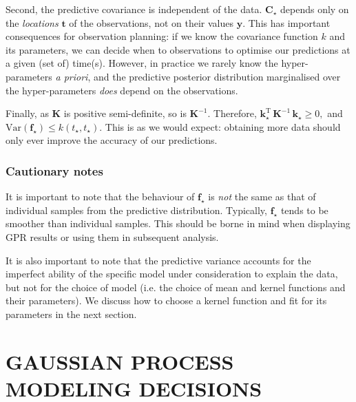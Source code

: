 \documentclass[letterpaper]{ar-1col}
\begin{document}
Second, the predictive covariance is independent of the data. $\mathbf{C}_\star$ depends only on the \emph{locations} $\mathbf{t}$ of the observations, not on their values $\mathbf{y}$. This has important consequences for observation planning: if we know the covariance function $k$ and its parameters, we can decide when to observations to optimise our predictions at a given (set of) time(s). However, in practice we rarely know the hyper-parameters \textit{a priori}, and the predictive posterior distribution marginalised over the hyper-parameters \textit{does} depend on the observations.

Finally, as $\mathbf{K}$ is positive semi-definite, so is $\mathbf{K}^{-1}$. Therefore, $\mathbf{k}_\star^{\mathrm{T}} \, \mathbf{K}^{-1} \, \mathbf{k}_\star \ge 0,$ and $\mathrm{Var}(\mathbf{f}_\star) \leq k(t_\star,t_\star)$. This is as we would expect: obtaining more data should only ever improve the accuracy of our predictions.

\subsubsection{Cautionary notes}

It is important to note that the behaviour of $\mathbf{f}_\star$ is \emph{not} the same as that of individual samples from the predictive distribution. Typically,  $\mathbf{f}_\star$ tends to be smoother than individual samples. This should be borne in mind when displaying GPR results or using them in subsequent analysis.

It is also important to note that the predictive variance accounts for the imperfect ability of the specific model under consideration to explain the data, but not for the choice of model (i.e. the choice of mean and kernel functions and their parameters). We discuss how to choose a kernel function and fit for its parameters in the next section.

\section{GAUSSIAN PROCESS MODELING DECISIONS}
\label{sec:choices}


\end{document}
